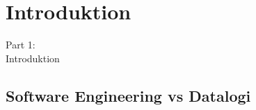 \section{Introduktion}
\begin{frame}
    \vspace{25mm}
    \begin{center}
        \Huge{Part 1:\\Introduktion}
    \end{center}
\end{frame}

\subsection{Software Engineering vs Datalogi}
